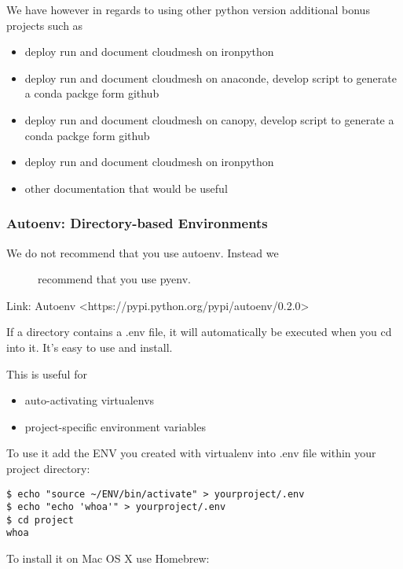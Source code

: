 We have however in regards to using other python version additional
bonus projects such as

\begin{itemize}

\item
  deploy run and document cloudmesh on ironpython
\item
  deploy run and document cloudmesh on anaconde, develop script to
  generate a conda packge form github
\item
  deploy run and document cloudmesh on canopy, develop script to
  generate a conda packge form github
\item
  deploy run and document cloudmesh on ironpython
\item
  other documentation that would be useful
\end{itemize}

\subsubsection{Autoenv: Directory-based
Environments}\label{autoenv-directory-based-environments}

\begin{description}
\item[We do not recommend that you use autoenv. Instead we]
recommend that you use pyenv.
\end{description}

Link:
Autoenv \textless{}https://pypi.python.org/pypi/autoenv/0.2.0\textgreater{}

If a directory contains a .env file, it will automatically be executed
when you cd into it. It's easy to use and install.

This is useful for

\begin{itemize}

\item
  auto-activating virtualenvs
\item
  project-specific environment variables
\end{itemize}

To use it add the ENV you created with virtualenv into .env file within
your project directory:

\begin{verbatim}
$ echo "source ~/ENV/bin/activate" > yourproject/.env
$ echo "echo 'whoa'" > yourproject/.env
$ cd project
whoa
\end{verbatim}

To install it on Mac OS X use Homebrew:

